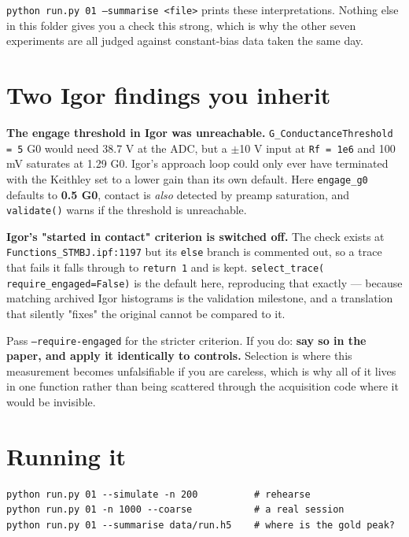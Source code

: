 \texttt{python run.\discretionary{}{}{}py 01 --summarise <file>} prints these interpretations. Nothing else in this folder gives you a check this strong, which is why the other seven experiments are all judged against constant-bias data taken the same day.

\section{Two Igor findings you inherit}

\textbf{The engage threshold in Igor was unreachable.} \texttt{G\_\discretionary{}{}{}Conductance\discretionary{}{}{}Threshold = 5} G0 would need 38.7 V at the ADC, but a $\pm$10 V input at \texttt{Rf = 1e6} and 100 mV saturates at 1.29 G0. Igor's approach loop could only ever have terminated with the Keithley set to a lower gain than its own default. Here \texttt{engage\_\discretionary{}{}{}g0} defaults to \textbf{0.5 G0}, contact is \emph{also} detected by preamp saturation, and \texttt{validate()} warns if the threshold is unreachable.

\textbf{Igor's "started in contact" criterion is switched off.} The check exists at \texttt{Functions\_\discretionary{}{}{}STMBJ.\discretionary{}{}{}ipf:1197} but its \texttt{else} branch is commented out, so a trace that fails it falls through to \texttt{return 1} and is kept. \texttt{select\_\discretionary{}{}{}trace( require\_\discretionary{}{}{}engaged=False)} is the default here, reproducing that exactly --- because matching archived Igor histograms is the validation milestone, and a translation that silently "fixes" the original cannot be compared to it.

Pass \texttt{--require-engaged} for the stricter criterion. If you do: \textbf{say so in the paper, and apply it identically to controls.} Selection is where this measurement becomes unfalsifiable if you are careless, which is why all of it lives in one function rather than being scattered through the acquisition code where it would be invisible.

\section{Running it}

\begin{lstlisting}[style=out]
python run.py 01 --simulate -n 200          # rehearse
python run.py 01 -n 1000 --coarse           # a real session
python run.py 01 --summarise data/run.h5    # where is the gold peak?
\end{lstlisting}

